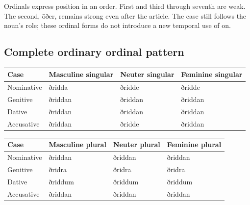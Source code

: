 Ordinals express position in an order. First and third through seventh are weak. The second, ōðer, remains strong even after the article. The case still follows the noun’s role; these ordinal forms do not introduce a new temporal use of on.

\subsection*{Complete ordinary ordinal pattern}

\par\begingroup
\fontsize{10.5}{13.2}\selectfont
\setlength{\LTleft}{0pt}\setlength{\LTright}{\fill}
\noindent
\begin{tabular}{@{}>{\raggedright\arraybackslash}p{22.0mm}>{\raggedright\arraybackslash}p{31.188mm}>{\raggedright\arraybackslash}p{31.188mm}>{\raggedright\arraybackslash}p{31.188mm}@{}}
\toprule
\textbf{Case} & \textbf{Masculine singular} & \textbf{Neuter singular} & \textbf{Feminine singular} \\
\midrule
Nominative & ðridda & ðridde & ðridde \\
Genitive & ðriddan & ðriddan & ðriddan \\
Dative & ðriddan & ðriddan & ðriddan \\
Accusative & ðriddan & ðridde & ðriddan \\
\bottomrule
\end{tabular}
\par\endgroup
\par\addvspace{5pt}
\par\begingroup
\fontsize{10.5}{13.2}\selectfont
\setlength{\LTleft}{0pt}\setlength{\LTright}{\fill}
\noindent
\begin{tabular}{@{}>{\raggedright\arraybackslash}p{22.0mm}>{\raggedright\arraybackslash}p{31.188mm}>{\raggedright\arraybackslash}p{31.188mm}>{\raggedright\arraybackslash}p{31.188mm}@{}}
\toprule
\textbf{Case} & \textbf{Masculine plural} & \textbf{Neuter plural} & \textbf{Feminine plural} \\
\midrule
Nominative & ðriddan & ðriddan & ðriddan \\
Genitive & ðridra & ðridra & ðridra \\
Dative & ðriddum & ðriddum & ðriddum \\
Accusative & ðriddan & ðriddan & ðriddan \\
\bottomrule
\end{tabular}
